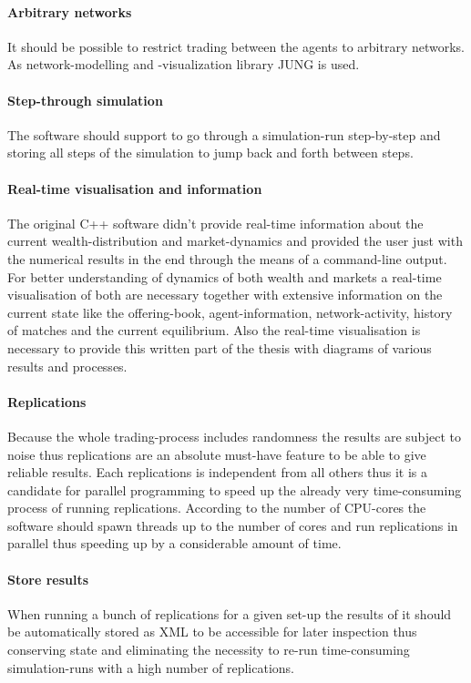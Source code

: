 \documentclass[Bachelorarbeit.tex]{subfiles}
\begin{document}
\paragraph{Arbitrary networks}
It should be possible to restrict trading between the agents to arbitrary networks. As network-modelling and -visualization library JUNG is used.

\paragraph{Step-through simulation}
The software should support to go through a simulation-run step-by-step and storing all steps of the simulation to jump back and forth between steps.

\paragraph{Real-time visualisation and information}
The original C++ software didn't provide real-time information about the current wealth-distribution and market-dynamics and provided the user just with the numerical results in the end through the means of a command-line output. For better understanding of dynamics of both wealth and markets a real-time visualisation of both are necessary together with extensive information on the current state like the offering-book, agent-information, network-activity, history of matches and the current equilibrium. Also the real-time visualisation is necessary to provide this written part of the thesis with diagrams of various results and processes.

\paragraph{Replications}
Because the whole trading-process includes randomness the results are subject to noise thus replications are an absolute must-have feature to be able to give reliable results. Each replications is independent from all others thus it is a candidate for parallel programming to speed up the already very time-consuming process of running replications. According to the number of CPU-cores the software should spawn threads up to the number of cores and run replications in parallel thus speeding up by a considerable amount of time.

\paragraph{Store results}
When running a bunch of replications for a given set-up the results of it should be automatically stored as XML to be accessible for later inspection thus conserving state and eliminating the necessity to re-run time-consuming simulation-runs with a high number of replications.
\end{document}
